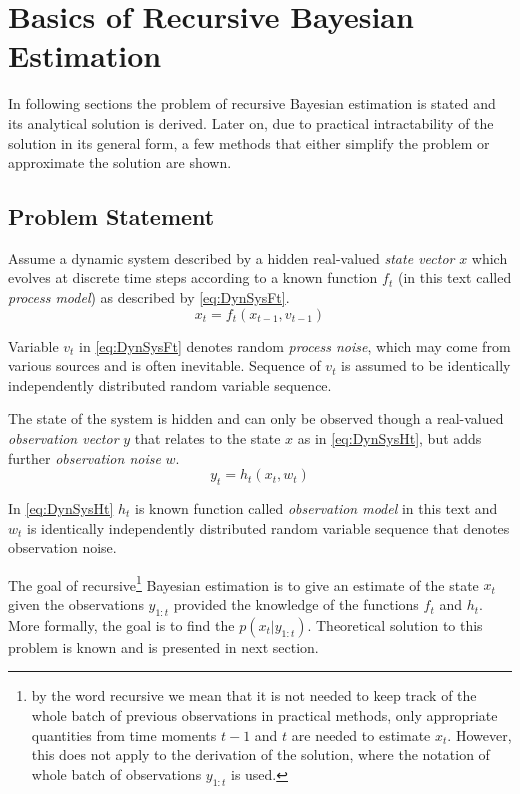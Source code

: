 \chapter{Basics of Recursive Bayesian Estimation}

In following sections the problem of recursive Bayesian estimation is stated and its analytical
solution is derived. Later on, due to practical intractability of the solution in its general form,
a few methods that either simplify the problem or approximate the solution are shown.

\section{Problem Statement}

Assume a dynamic system described by a hidden real-valued \emph{state vector} \(x\) which evolves at
discrete time steps according to a known function \(f_t\) (in this text called \emph{process model})
as described by \eqref{eq:DynSysFt}.
\begin{equation} \label{eq:DynSysFt}
	x_t = f_t(x_{t-1}, v_{t-1})
\end{equation}

Variable \(v_t\) in \eqref{eq:DynSysFt} denotes random \emph{process noise}, which may come from various
sources and is often inevitable. Sequence of \(v_t\) is assumed to be identically independently
distributed random variable sequence.

The state of the system is hidden and can only be observed though a real-valued \emph{observation vector}
\(y\) that relates to the state \(x\) as in \eqref{eq:DynSysHt}, but adds further \emph{observation
noise} \(w\).
\begin{equation} \label{eq:DynSysHt}
	y_t = h_t(x_t, w_t)
\end{equation}

In \eqref{eq:DynSysHt} \(h_t\) is known function called \emph{observation model} in this text and \(w_t\) is
identically independently distributed random variable sequence that denotes observation noise.

The goal of recursive\footnote{by the word recursive we mean that it is not needed to keep track of
the whole batch of previous observations in practical methods, only appropriate quantities from time
moments \(t-1\) and \(t\) are needed to estimate \(x_t\). However, this does not apply to the
derivation of the solution, where the notation of whole batch of observations \(y_{1:t}\) is used.}
Bayesian estimation is to give an estimate of the state \(x_t\) given the
observations \(y_{1:t}\) provided the knowledge of the functions \(f_t\) and \(h_t\).
More formally, the goal is to find the {\pdf} \(p(x_t | y_{1:t})\).
Theoretical solution to this problem is known and is presented in next section.

